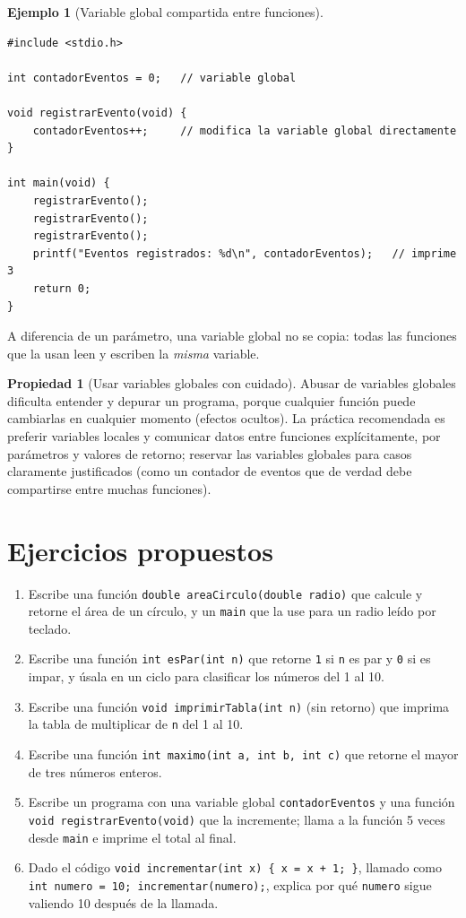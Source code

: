 \documentclass[11pt,letterpaper]{article}
\theoremstyle{definition}
\newtheorem{ejemplo}[definicion]{Ejemplo}
\newtheorem{propiedad}[definicion]{Propiedad}
\begin{document}
\begin{ejemplo}[Variable global compartida entre funciones]
\begin{lstlisting}
#include <stdio.h>

int contadorEventos = 0;   // variable global

void registrarEvento(void) {
    contadorEventos++;     // modifica la variable global directamente
}

int main(void) {
    registrarEvento();
    registrarEvento();
    registrarEvento();
    printf("Eventos registrados: %d\n", contadorEventos);   // imprime 3
    return 0;
}
\end{lstlisting}
A diferencia de un parámetro, una variable global no se copia: todas las funciones que la usan
leen y escriben la \emph{misma} variable.
\end{ejemplo}

\begin{propiedad}[Usar variables globales con cuidado]
Abusar de variables globales dificulta entender y depurar un programa, porque cualquier función
puede cambiarlas en cualquier momento (efectos ocultos). La práctica recomendada es preferir
variables locales y comunicar datos entre funciones explícitamente, por parámetros y valores de
retorno; reservar las variables globales para casos claramente justificados (como un contador de
eventos que de verdad debe compartirse entre muchas funciones).
\end{propiedad}

\section{Ejercicios propuestos}

\begin{enumerate}[leftmargin=1.2cm]
  \item Escribe una función \texttt{double areaCirculo(double radio)} que calcule y retorne el
        área de un círculo, y un \texttt{main} que la use para un radio leído por teclado.
  \item Escribe una función \texttt{int esPar(int n)} que retorne \texttt{1} si \texttt{n} es par y
        \texttt{0} si es impar, y úsala en un ciclo para clasificar los números del 1 al 10.
  \item Escribe una función \texttt{void imprimirTabla(int n)} (sin retorno) que imprima la tabla
        de multiplicar de \texttt{n} del 1 al 10.
  \item Escribe una función \texttt{int maximo(int a, int b, int c)} que retorne el mayor de tres
        números enteros.
  \item Escribe un programa con una variable global \texttt{contadorEventos} y una función
        \texttt{void registrarEvento(void)} que la incremente; llama a la función 5 veces desde
        \texttt{main} e imprime el total al final.
  \item Dado el código
        \texttt{void incrementar(int x) \{ x = x + 1; \}}, llamado como
        \texttt{int numero = 10; incrementar(numero);}, explica por qué \texttt{numero} sigue
        valiendo 10 después de la llamada.
\end{enumerate}
\end{document}
